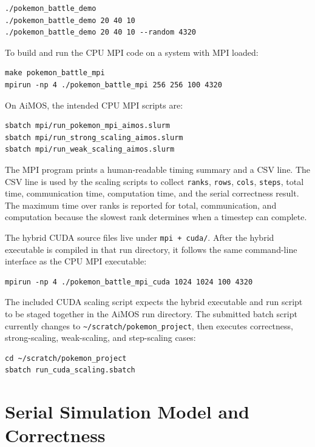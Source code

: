 \documentclass[10pt,twocolumn]{article}
\begin{document}
\begin{lstlisting}
./pokemon_battle_demo
./pokemon_battle_demo 20 40 10
./pokemon_battle_demo 20 40 10 --random 4320
\end{lstlisting}

To build and run the CPU MPI code on a system with MPI loaded:

\begin{lstlisting}
make pokemon_battle_mpi
mpirun -np 4 ./pokemon_battle_mpi 256 256 100 4320
\end{lstlisting}

On AiMOS, the intended CPU MPI scripts are:

\begin{lstlisting}
sbatch mpi/run_pokemon_mpi_aimos.slurm
sbatch mpi/run_strong_scaling_aimos.slurm
sbatch mpi/run_weak_scaling_aimos.slurm
\end{lstlisting}

The MPI program prints a human-readable timing summary and a CSV line. The CSV line is used by the scaling scripts to collect \texttt{ranks}, \texttt{rows}, \texttt{cols}, \texttt{steps}, total time, communication time, computation time, and the serial correctness result. The maximum time over ranks is reported for total, communication, and computation because the slowest rank determines when a timestep can complete.

The hybrid CUDA source files live under \texttt{mpi + cuda/}. After the hybrid executable is compiled in that run directory, it follows the same command-line interface as the CPU MPI executable:

\begin{lstlisting}
mpirun -np 4 ./pokemon_battle_mpi_cuda 1024 1024 100 4320
\end{lstlisting}

The included CUDA scaling script expects the hybrid executable and run script to be staged together in the AiMOS run directory. The submitted batch script currently changes to \texttt{\textasciitilde/scratch/pokemon\_project}, then executes correctness, strong-scaling, weak-scaling, and step-scaling cases:

\begin{lstlisting}
cd ~/scratch/pokemon_project
sbatch run_cuda_scaling.sbatch
\end{lstlisting}

\FloatBarrier
\section*{Serial Simulation Model and Correctness}
\end{document}
